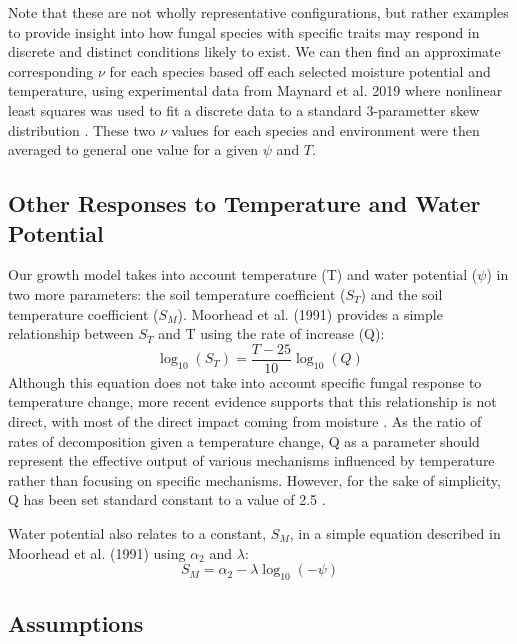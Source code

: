 \documentclass[12pt]{article}
\begin{document}
Note that these are not wholly representative configurations, but rather examples to provide insight into how fungal species with specific traits may respond in discrete and distinct conditions likely to exist. We can then find an approximate corresponding $\nu$ for each species based off each selected moisture potential and temperature, using experimental data from Maynard et al. 2019 where nonlinear least squares was used to fit a discrete data to a standard 3-parametter skew distribution \cite{Maynard2019}. These two $\nu$ values for each species and environment were then averaged to general one value for a given $\psi$ and $T$.

\begin{multicols}{2}	
\subsection{Other Responses to Temperature and Water Potential}\label{Other Responses to Temperature and Water Potential}

Our growth model takes into account temperature (T) and water potential ($\psi$) in two more parameters: the soil temperature coefficient ($S_T$) and the soil temperature coefficient ($S_M$). Moorhead et al. (1991) provides a simple relationship between $S_T$ and T using the rate of increase (Q):
\begin{equation}
\log_{10}(S_T) = \frac{T-25}{10}\log_{10}(Q)
\end{equation}
Although this equation does not take into account specific fungal response to temperature change, more recent evidence supports that this relationship is not direct, with most of the direct impact coming from moisture \cite{Petraglia2019}. As the ratio of rates of decomposition given a temperature change, Q as a parameter should represent the effective output of various mechanisms influenced by temperature rather than focusing on specific mechanisms. However, for the sake of simplicity, Q has been set standard constant to a value of 2.5 \cite{Moorhead1991}.

Water potential also relates to a constant, $S_M$, in a simple equation described in Moorhead et al. (1991) using $\alpha_2$ and $\lambda$:
\begin{equation}
S_M = \alpha_2 -\lambda \log_{10}(-\psi)
\end{equation}

\subsection{Assumptions}


\end{multicols}
\end{document}

